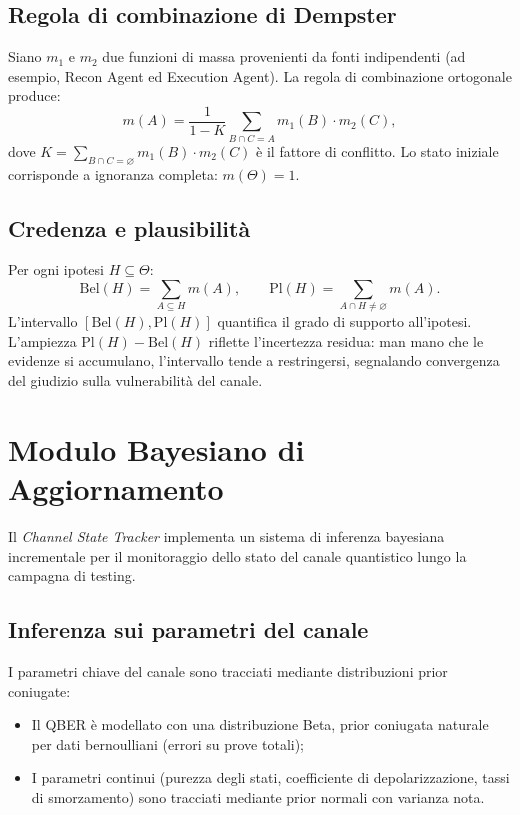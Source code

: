 \subsection{Regola di combinazione di Dempster}
Siano $m_1$ e $m_2$ due funzioni di massa provenienti da fonti indipendenti (ad esempio, Recon Agent ed Execution Agent). La regola di combinazione ortogonale produce:
\[
    m(A) = \frac{1}{1 - K} \sum_{B \cap C = A} m_1(B) \cdot m_2(C),
\]
dove $K = \sum_{B \cap C = \varnothing} m_1(B) \cdot m_2(C)$ è il fattore di conflitto. Lo stato iniziale corrisponde a ignoranza completa: $m(\Theta) = 1$.

\subsection{Credenza e plausibilità}
Per ogni ipotesi $H \subseteq \Theta$:
\[
    \mathrm{Bel}(H) = \sum_{A \subseteq H} m(A), \qquad
    \mathrm{Pl}(H) = \sum_{A \cap H \neq \varnothing} m(A).
\]
L'intervallo $[\mathrm{Bel}(H), \mathrm{Pl}(H)]$ quantifica il grado di supporto all'ipotesi. L'ampiezza $\mathrm{Pl}(H) - \mathrm{Bel}(H)$ riflette l'incertezza residua: man mano che le evidenze si accumulano, l'intervallo tende a restringersi, segnalando convergenza del giudizio sulla vulnerabilità del canale.

\section{Modulo Bayesiano di Aggiornamento}
\label{sec:bayesian-tracker}

Il \emph{Channel State Tracker} implementa un sistema di inferenza bayesiana incrementale per il monitoraggio dello stato del canale quantistico lungo la campagna di testing.

\subsection{Inferenza sui parametri del canale}
I parametri chiave del canale sono tracciati mediante distribuzioni prior coniugate:
\begin{itemize}
    \item Il QBER è modellato con una distribuzione Beta, prior coniugata naturale per dati bernoulliani (errori su prove totali);
    
    \item I parametri continui (purezza degli stati, coefficiente di depolarizzazione, tassi di smorzamento) sono tracciati mediante prior normali con varianza nota.
\end{itemize}

